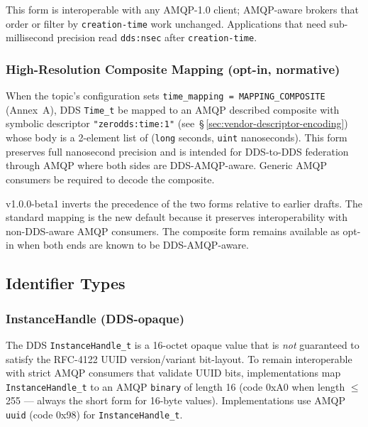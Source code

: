 \documentclass{../styles/zerodds-vendor-spec}
\begin{document}
This form is interoperable with any AMQP-1.0 client; AMQP-aware
brokers that order or filter by \texttt{creation-time} work
unchanged. Applications that need sub-millisecond precision read
\texttt{dds:nsec} after \texttt{creation-time}.

\subsubsection{High-Resolution Composite Mapping (opt-in, normative)}

When the topic's configuration sets
\texttt{time\_mapping = MAPPING\_COMPOSITE} (Annex~A), DDS
\texttt{Time\_t}  be mapped to an AMQP described
composite with symbolic descriptor \texttt{"zerodds:time:1"}
(see~\S\,\ref{sec:vendor-descriptor-encoding}) whose body is a
2-element list of (\texttt{long} seconds, \texttt{uint}
nanoseconds). This form preserves full nanosecond precision and
is intended for DDS-to-DDS federation through AMQP where both
sides are DDS-AMQP-aware. Generic AMQP consumers  be required to decode the composite.

\begin{specnote}
v1.0.0-beta1 inverts the precedence of the two forms relative to
earlier drafts. The standard mapping is the new default because
it preserves interoperability with non-DDS-aware AMQP consumers.
The composite form remains available as opt-in when both ends are
known to be DDS-AMQP-aware.
\end{specnote}

\subsection{Identifier Types}\label{sec:pim-identifier-types}

\subsubsection{InstanceHandle (DDS-opaque)}

The DDS \texttt{InstanceHandle\_t} is a 16-octet opaque value that
is \emph{not} guaranteed to satisfy the RFC-4122 UUID
version/variant bit-layout. To remain interoperable with strict
AMQP consumers that validate UUID bits, implementations
 map \texttt{InstanceHandle\_t} to an AMQP
\texttt{binary} of length 16 (code \textsf{0xA0} when length
$\le$ 255 --- always the short form for 16-byte values).
Implementations  use AMQP \texttt{uuid}
(code \textsf{0x98}) for \texttt{InstanceHandle\_t}.
\end{document}
